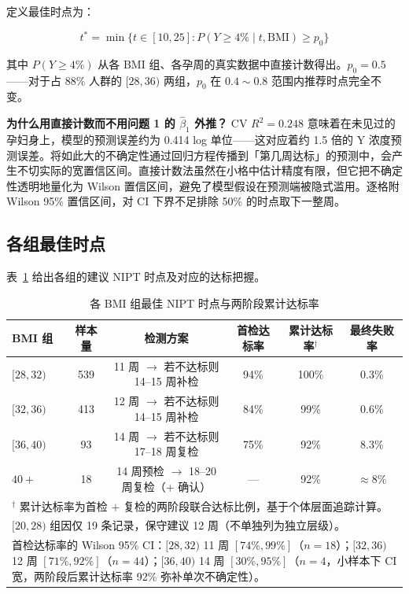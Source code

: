 \documentclass{mcm-paper}
\begin{document}
定义最佳时点为：

\begin{equation}
t^* = \min\Big\{ t \in [10, 25] : P(Y \geq 4\% \mid t, \mathrm{BMI}) \geq p_0 \Big\}
\end{equation}

其中 $P(Y\geq 4\%)$ 从各 BMI 组、各孕周的真实数据中直接计数得出。$p_0=0.5$——对于占 88\% 人群的 $[28,36)$ 两组，$p_0$ 在 $0.4\sim0.8$ 范围内推荐时点完全不变。

\textbf{为什么用直接计数而不用问题 1 的 $\hat{\beta}_1$ 外推？} CV $R^2=0.248$ 意味着在未见过的孕妇身上，模型的预测误差约为 0.414 log 单位——这对应着约 1.5 倍的 Y 浓度预测误差。将如此大的不确定性通过回归方程传播到「第几周达标」的预测中，会产生不切实际的宽置信区间。直接计数法虽然在小格中估计精度有限，但它把不确定性透明地量化为 Wilson 置信区间，避免了模型假设在预测端被隐式滥用。逐格附 Wilson 95\% 置信区间，对 CI 下界不足排除 50\% 的时点取下一整周。

\subsection{各组最佳时点}

表~\ref{tab:timing} 给出各组的建议 NIPT 时点及对应的达标把握。

\begin{table}[H]
\centering
\caption{各 BMI 组最佳 NIPT 时点与两阶段累计达标率}
\label{tab:timing}
\begin{tabular}{lccccc}
\toprule
BMI 组 & 样本量 & 检测方案 & 首检达标率 & 累计达标率$^{\dag}$ & 最终失败率 \\
\midrule
$[28,32)$  & 539 & 11 周 $\to$ 若不达标则 14--15 周补检 & 94\%  & 100\% & 0.3\% \\
$[32,36)$ & 413 & 12 周 $\to$ 若不达标则 14--15 周补检 & 84\%  & 99\%  & 0.6\% \\
$[36,40)$ & 93  & 14 周 $\to$ 若不达标则 17--18 周复检 & 75\%  & 92\%  & 8.3\% \\
$40+$     & 18  & 14 周预检 $\to$ 18--20 周复检（$+$ 确认） & —    & 92\%  & $\approx 8\%$ \\
\bottomrule
\multicolumn{6}{p{13.5cm}}{\footnotesize $^{\dag}$ 累计达标率为首检 $+$ 复检的两阶段联合达标比例，基于个体层面追踪计算。} \\
\multicolumn{6}{p{13.5cm}}{\footnotesize $[20,28)$ 组因仅 19 条记录，保守建议 12 周（不单独列为独立层级）。} \\
\multicolumn{6}{p{13.5cm}}{\footnotesize 首检达标率的 Wilson 95\% CI：$[28,32)$ 11 周 $[74\%,99\%]$（$n=18$）；$[32,36)$ 12 周 $[71\%,92\%]$（$n=44$）；$[36,40)$ 14 周 $[30\%,95\%]$（$n=4$，小样本下 CI 宽，两阶段后累计达标率 92\% 弥补单次不确定性）。}
\end{tabular}
\end{table}
\end{document}
